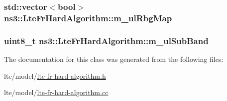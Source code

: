 \subsubsection[{\texorpdfstring{m\+\_\+ul\+Rbg\+Map}{m_ulRbgMap}}]{\setlength{\rightskip}{0pt plus 5cm}std\+::vector$<$bool$>$ ns3\+::\+Lte\+Fr\+Hard\+Algorithm\+::m\+\_\+ul\+Rbg\+Map\hspace{0.3cm}{\ttfamily [private]}}\hypertarget{classns3_1_1LteFrHardAlgorithm_ab121ab28a398ee8759b6b9f884c42c19}{}\label{classns3_1_1LteFrHardAlgorithm_ab121ab28a398ee8759b6b9f884c42c19}
\subsubsection[{\texorpdfstring{m\+\_\+ul\+Sub\+Band}{m_ulSubBand}}]{\setlength{\rightskip}{0pt plus 5cm}uint8\+\_\+t ns3\+::\+Lte\+Fr\+Hard\+Algorithm\+::m\+\_\+ul\+Sub\+Band\hspace{0.3cm}{\ttfamily [private]}}\hypertarget{classns3_1_1LteFrHardAlgorithm_a70f1cda5f3524263e8718771c1233751}{}\label{classns3_1_1LteFrHardAlgorithm_a70f1cda5f3524263e8718771c1233751}


The documentation for this class was generated from the following files\+:\begin{DoxyCompactItemize}
\item 
lte/model/\hyperlink{lte-fr-hard-algorithm_8h}{lte-\/fr-\/hard-\/algorithm.\+h}\item 
lte/model/\hyperlink{lte-fr-hard-algorithm_8cc}{lte-\/fr-\/hard-\/algorithm.\+cc}\end{DoxyCompactItemize}
